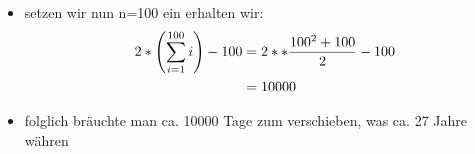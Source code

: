 \begin{itemize}{a)}
\begin{equation}
\begin{aligned}
			 		\end{aligned}
			 	\end{equation}
			 	\item setzen wir nun n=100 ein erhalten wir:
			 	\begin{equation}
			 		\begin{aligned}
			 			2*\left(\displaystyle\sum_{i=1}^{100}{i}\right) - 100 &= 2**\frac{100^2 + 100}{2} - 100 \notag \\
			 			&= 10000 \\
			 		\end{aligned}
			 	\end{equation}
			 	\item folglich bräuchte man ca. 10000 Tage zum verschieben, was ca. 27 Jahre währen \\
 \end{itemize}



